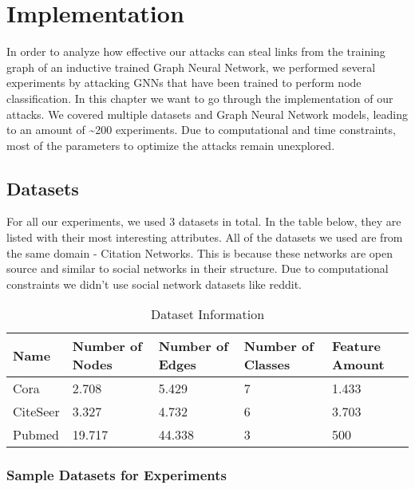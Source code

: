 \chapter{Implementation}

  In order to analyze how effective our attacks can steal links from the training graph of an inductive trained Graph Neural Network, we performed several experiments by attacking GNNs that have been trained to perform node classification.
  In this chapter we want to go through the implementation of our attacks.
  We covered multiple datasets and Graph Neural Network models, leading to an amount of \textasciitilde200 experiments.
  Due to computational and time constraints, most of the parameters to optimize the attacks remain unexplored.

  \section{Datasets}
  \label{section:datasets}

    For all our experiments, we used 3 datasets in total.
    In the table below, they are listed with their most interesting attributes.
    All of the datasets we used are from the same domain - Citation Networks.
    This is because these networks are open source and similar to social networks in their structure.
    Due to computational constraints we didn't use social network datasets like reddit.

    \vspace{0.48cm}
    \begin{table}[!h]
      \centering
      \footnotesize
      \begin{tabular}{l|l|l|l|l}
        \toprule
        Name & Number of Nodes & Number of Edges & Number of Classes & Feature Amount \\
        \midrule
        Cora & 2.708            & 5.429            & 7                 & 1.433 \\
        CiteSeer & 3.327        & 4.732            & 6                 & 3.703 \\
        Pubmed & 19.717         & 44.338           & 3                 & 500 \\
        \bottomrule
      \end{tabular}
      \caption{Dataset Information}
      \label{table:datasets}
    \end{table}

    \subsection*{Sample Datasets for Experiments}
    \label{subsection:dataset-samples}

